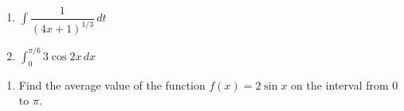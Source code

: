 \documentclass[11pt]{article}
\newcommand{\ds}{\displaystyle}
\begin{document}
\begin{multicols}{2}
\begin{enumerate}
\setcounter{enumi}{\theenumCount}
\item $\ds \int \dfrac{1}{(4x+1)^{1/3}} \, dt$
\item $\ds \int_0^{\pi/6} 3\cos 2x \, dx$
\setcounter{enumCount}{\theenumi}
\end{enumerate}
\end{multicols}
\vfill


\begin{enumerate}
\setcounter{enumi}{\theenumCount}
\item Find the average value of the function $f(x) = 2\sin x$ on the interval from $0$ to $\pi$. 
\vfill
\setcounter{enumCount}{\theenumi}
\end{enumerate}
\end{document}
